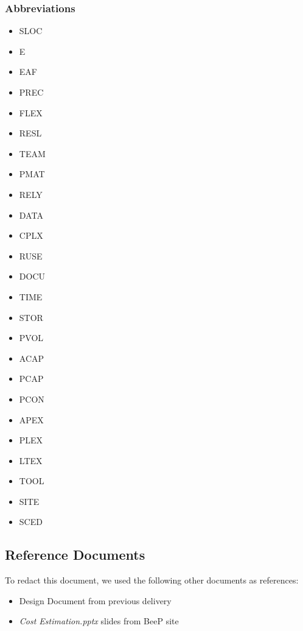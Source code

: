 	\subsubsection{Abbreviations}
		\begin{itemize}
			\item SLOC
			\item E
			\item EAF
			\item PREC
			\item FLEX
			\item RESL
			\item TEAM
			\item PMAT
			\item RELY
			\item DATA
			\item CPLX
			\item RUSE
			\item DOCU
			\item TIME
			\item STOR
			\item PVOL
			\item ACAP
			\item PCAP
			\item PCON
			\item APEX
			\item PLEX
			\item LTEX
			\item TOOL
			\item SITE
			\item SCED
		\end{itemize}
\subsection{Reference Documents}
	To redact this document, we used the following other documents as references:
	\begin{itemize}
		\item Design Document from previous delivery
		\item \emph{Cost Estimation.pptx} slides from BeeP site
	\end{itemize}
